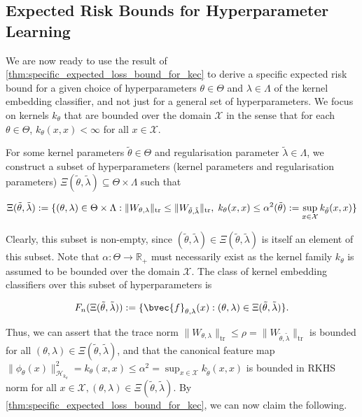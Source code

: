 \documentclass{article}
\begin{document}
	\subsection{Expected Risk Bounds for Hyperparameter Learning}
	\label{app:expected_risk_bounds_for_hyperparameter_learning}
	
		We are now ready to use the result of \cref{thm:specific_expected_loss_bound_for_kec} to derive a specific expected risk bound for a given choice of hyperparameters $\theta \in \Theta$ and $\lambda \in \Lambda$ of the kernel embedding classifier, and not just for a general set of hyperparameters. We focus on kernels $k_{\theta}$ that are bounded over the domain $\mathcal{X}$ in the sense that for each $\theta \in \Theta$, $k_{\theta}(x, x) < \infty$ for all $x \in \mathcal{X}$.
		
		For some kernel parameters $\tilde{\theta} \in \Theta$ and regularisation parameter $\tilde{\lambda} \in \Lambda$, we construct a subset of hyperparameters (kernel parameters and regularisation parameters) $\Xi(\tilde{\theta}, \tilde{\lambda}) \subseteq \Theta \times \Lambda$ such that

		\begin{equation}
			\Xi(\tilde{\theta}, \tilde{\lambda}) := \{ (\theta, \lambda) \in \Theta \times \Lambda : \| W_{\theta, \lambda} \|_{\mathrm{tr}} \leq \| W_{\tilde{\theta}, \tilde{\lambda}} \|_{\mathrm{tr}}, \; k_{\theta}(x, x) \leq \alpha^{2}(\tilde{\theta}) := \sup_{x \in \mathcal{X}} k_{\tilde{\theta}}(x, x) \} \\
			\label{eq:hyperparameter_subset_definition}
		\end{equation}
		
		Clearly, this subset is non-empty, since $(\tilde{\theta}, \tilde{\lambda}) \in \Xi(\tilde{\theta}, \tilde{\lambda})$ is itself an element of this subset. Note that $\alpha : \Theta \to \mathbb{R}_{+}$ must necessarily exist as the kernel family $k_{\theta}$ is assumed to be bounded over the domain $\mathcal{X}$. The class of kernel embedding classifiers over this subset of hyperparameters is 
		
		\begin{equation}
			F_{n}(\Xi(\tilde{\theta}, \tilde{\lambda})) := \{\bvec{f}_{\theta, \lambda}(x) : (\theta, \lambda) \in \Xi(\tilde{\theta}, \tilde{\lambda}) \}.
		\end{equation}
		
		Thus, we can assert that the trace norm $\| W_{\theta, \lambda} \|_{\mathrm{tr}} \leq \rho = \| W_{\tilde{\theta}, \tilde{\lambda}} \|_{\mathrm{tr}}$ is bounded for all $(\theta, \lambda) \in \Xi(\tilde{\theta}, \tilde{\lambda})$, and that the canonical feature map $\| \phi_{\theta}(x) \|_{\mathcal{H}_{k_{\theta}}}^{2} = k_{\theta}(x, x) \leq \alpha^{2} = \sup_{x \in \mathcal{X}} k_{\tilde{\theta}}(x, x)$ is bounded in RKHS norm for all $x \in \mathcal{X}, (\theta, \lambda) \in \Xi(\tilde{\theta}, \tilde{\lambda})$. By \cref{thm:specific_expected_loss_bound_for_kec}, we can now claim the following.
\end{document}
